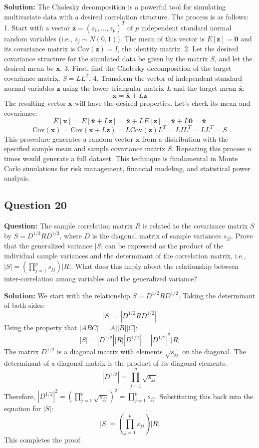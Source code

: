 \textbf{Solution:}
The Cholesky decomposition is a powerful tool for simulating multivariate data with a desired correlation structure. The process is as follows:
1. Start with a vector $\mathbf{z} = (z_1, \dots, z_p)^T$ of $p$ independent standard normal random variables (i.e., $z_j \sim N(0,1)$). The mean of this vector is $E[\mathbf{z}] = \mathbf{0}$ and its covariance matrix is $\text{Cov}(\mathbf{z}) = I$, the identity matrix.
2. Let the desired covariance structure for the simulated data be given by the matrix $S$, and let the desired mean be $\bar{\mathbf{x}}$.
3. First, find the Cholesky decomposition of the target covariance matrix, $S = LL^T$.
4. Transform the vector of independent standard normal variables $\mathbf{z}$ using the lower triangular matrix $L$ and the target mean $\bar{\mathbf{x}}$:
$$ \mathbf{x} = \bar{\mathbf{x}} + L\mathbf{z} $$
The resulting vector $\mathbf{x}$ will have the desired properties. Let's check its mean and covariance:
$$ E[\mathbf{x}] = E[\bar{\mathbf{x}} + L\mathbf{z}] = \bar{\mathbf{x}} + L E[\mathbf{z}] = \bar{\mathbf{x}} + L\mathbf{0} = \bar{\mathbf{x}} $$
$$ \text{Cov}(\mathbf{x}) = \text{Cov}(\bar{\mathbf{x}} + L\mathbf{z}) = L \text{Cov}(\mathbf{z}) L^T = L I L^T = LL^T = S $$
This procedure generates a random vector $\mathbf{x}$ from a distribution with the specified sample mean and sample covariance matrix $S$. Repeating this process $n$ times would generate a full dataset. This technique is fundamental in Monte Carlo simulations for risk management, financial modeling, and statistical power analysis.

\subsection*{Question 20}
\textbf{Question:} The sample correlation matrix $R$ is related to the covariance matrix $S$ by $S = D^{1/2} R D^{1/2}$, where $D$ is the diagonal matrix of sample variances $s_{jj}$. Prove that the generalized variance $|S|$ can be expressed as the product of the individual sample variances and the determinant of the correlation matrix, i.e., $|S| = (\prod_{j=1}^p s_{jj}) |R|$. What does this imply about the relationship between inter-correlation among variables and the generalized variance?

\textbf{Solution:}
We start with the relationship $S = D^{1/2} R D^{1/2}$.
Taking the determinant of both sides:
$$ |S| = |D^{1/2} R D^{1/2}| $$
Using the property that $|ABC| = |A||B||C|$:
$$ |S| = |D^{1/2}| |R| |D^{1/2}| = |D^{1/2}|^2 |R| $$
The matrix $D^{1/2}$ is a diagonal matrix with elements $\sqrt{s_{jj}}$ on the diagonal. The determinant of a diagonal matrix is the product of its diagonal elements.
$$ |D^{1/2}| = \prod_{j=1}^p \sqrt{s_{jj}} $$
Therefore, $|D^{1/2}|^2 = \left(\prod_{j=1}^p \sqrt{s_{jj}}\right)^2 = \prod_{j=1}^p s_{jj}$.
Substituting this back into the equation for $|S|$:
$$ |S| = \left(\prod_{j=1}^p s_{jj}\right) |R| $$
This completes the proof.

